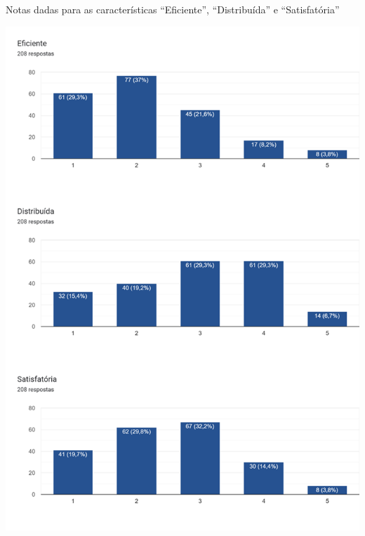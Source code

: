 \begin{MyCenteredFigure}
  \caption{Notas dadas para as características ``Eficiente'', ``Distribuída'' e ``Satisfatória''}
  \label{fig:6.0-Opiniao-4_6}
  \includegraphics[width=\textwidth]{files/img/2.02!3-organizacao/2.02!3.1.4-forms/6.0-Opiniao-4_6}
\end{MyCenteredFigure}



